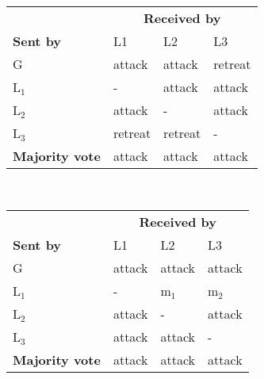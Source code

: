 \documentclass[11pt]{article}
\begin{document}
\begin{center}
\begin{tabular}{llll}
 \hline
  & \multicolumn{3}{c}{{\bf Received by}}\\
 \cline{2-4}
  {\bf Sent by}  & L1 & L2 & L3\\
\hline
 G & attack & attack & retreat \\
 L\(_1\) & - & attack & attack \\
 L\(_2\) & attack & - & attack \\
 L\(_3\) & retreat & retreat & - \\
 \hline
{\bf Majority vote} & attack & attack & attack\\
 \hline
\end{tabular}~~~~~
\begin{tabular}{llll}
 \hline
  & \multicolumn{3}{c}{{\bf Received by}}\\
 \cline{2-4}
  {\bf Sent by}  & L1 & L2 & L3\\
\hline
 G & attack & attack & attack \\
 L\(_1\) & - & m$_1$ & m$_2$ \\
 L\(_2\) & attack & - & attack \\
 L\(_3\) & attack & attack & - \\
 \hline
{\bf Majority vote} & attack & attack & attack\\
 \hline
\end{tabular}
\end{center}

\vfill

\pagebreak
\end{document}

